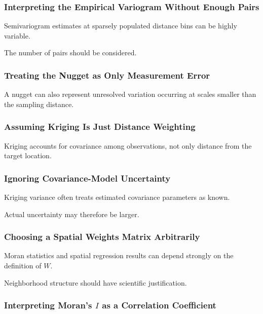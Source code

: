 \subsubsection{Interpreting the Empirical Variogram Without Enough Pairs}

Semivariogram estimates at sparsely populated distance bins can be highly
variable.

The number of pairs should be considered.

\subsubsection{Treating the Nugget as Only Measurement Error}

A nugget can also represent unresolved variation occurring at scales
smaller than the sampling distance.

\subsubsection{Assuming Kriging Is Just Distance Weighting}

Kriging accounts for covariance among observations, not only distance
from the target location.

\subsubsection{Ignoring Covariance-Model Uncertainty}

Kriging variance often treats estimated covariance parameters as known.

Actual uncertainty may therefore be larger.

\subsubsection{Choosing a Spatial Weights Matrix Arbitrarily}

Moran statistics and spatial regression results can depend strongly on
the definition of \(W\).

Neighborhood structure should have scientific justification.

\subsubsection{Interpreting Moran's \(I\) as a Correlation Coefficient}

